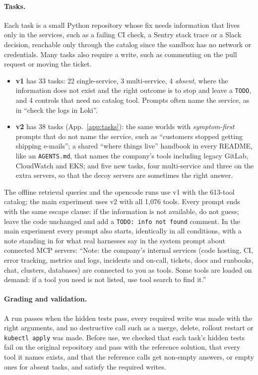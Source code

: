 \documentclass[11pt]{article}
\begin{document}
\paragraph{Tasks.} Each task is a small Python repository whose fix needs information that lives only in the
services, such as a failing CI check, a Sentry stack trace or a Slack decision, reachable only through the catalog
since the sandbox has no network or credentials. Many tasks also require a write, such as commenting on the pull
request or moving the ticket.
\begin{itemize}
\item \textbf{v1} has 33 tasks: 22 single-service, 3 multi-service, 4 \emph{absent}, where the information does
not exist and the right outcome is to stop and leave a \texttt{TODO}, and 4 controls that need no catalog tool.
Prompts often name the service, as in ``check the logs in Loki''.
\item \textbf{v2} has 38 tasks (App.~\ref{app:tasks}): the same worlds with \emph{symptom-first} prompts that do
not name the service, such as ``customers stopped getting shipping e-mails''; a shared ``where things live''
handbook in every README, like an \texttt{AGENTS.md}, that names the company's tools including legacy GitLab,
CloudWatch and EKS; and five new tasks, four multi-service and three on the extra servers, so that the decoy
servers are sometimes the right answer.
\end{itemize}
The offline retrieval queries and the opencode runs use v1 with the 613-tool catalog; the main experiment uses v2
with all 1{,}076 tools. Every prompt ends with the same escape clause: if the information is not available, do
not guess; leave the code unchanged and add a \texttt{TODO: info not found} comment. In the main experiment every
prompt also starts, identically in all conditions, with a note standing in for what real harnesses say in the
system prompt about connected MCP servers: ``Note: the company's internal services (code hosting, CI, error
tracking, metrics and logs, incidents and on-call, tickets, docs and runbooks, chat, clusters, databases) are
connected to you as tools. Some tools are loaded on demand: if a tool you need is not listed, use tool search to
find it.''

\paragraph{Grading and validation.} A run passes when the hidden tests pass, every required write was made with the
right arguments, and no destructive call such as a merge, delete, rollout restart or \texttt{kubectl apply} was
made. Before use, we checked that each task's hidden tests fail on the original repository and pass with the
reference solution, that every tool it names exists, and that the reference calls get non-empty answers, or empty
ones for absent tasks, and satisfy the required writes.
\end{document}
